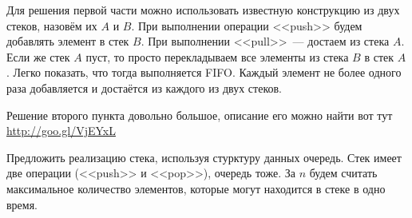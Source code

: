 \documentclass[addpoints]{exam}
\begin{document}
\begin{questions}

\begin{solution}

Для решения первой части можно использовать известную конструкцию из двух стеков, назовём их $A$ и $B$. При выполнении операции <<push>> будем добавлять элемент в стек $B$. При выполнении <<pull>>~--- достаем из стека $A$. Если же стек $A$ пуст, то просто перекладываем все элементы из стека $B$ в стек $A$. Легко показать, что тогда выполняется FIFO. Каждый элемент не более одного раза добавляется и достаётся из каждого из двух стеков.

Решение второго пункта довольно большое, описание его можно найти вот тут \url{http://goo.gl/VjEYxL}

\end{solution}

\question Предложить реализацию стека, используя стурктуру данных очередь. Стек имеет две операции (<<push>> и <<pop>>), очередь тоже. За $n$ будем считать максимальное количество элементов, которые могут находится в стеке в одно время.

\end{questions}
\end{document}
